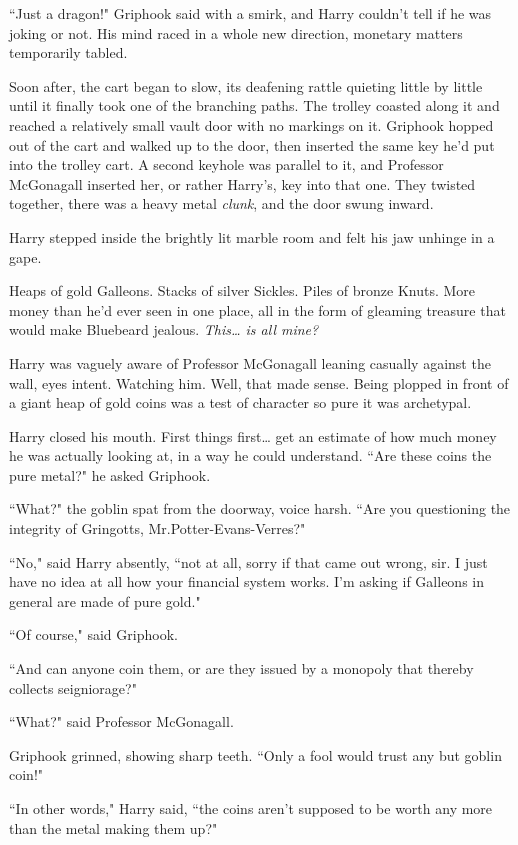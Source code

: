 ``Just a dragon!" Griphook said with a smirk, and Harry couldn't tell if he was joking or not. His mind raced in a whole new direction, monetary matters temporarily tabled.

Soon after, the cart began to slow, its deafening rattle quieting little by little until it finally took one of the branching paths. The trolley coasted along it and reached a relatively small vault door with no markings on it. Griphook hopped out of the cart and walked up to the door, then inserted the same key he'd put into the trolley cart. A second keyhole was parallel to it, and Professor McGonagall inserted her, or rather Harry's, key into that one. They twisted together, there was a heavy metal \emph{clunk}, and the door swung inward.

Harry stepped inside the brightly lit marble room and felt his jaw unhinge in a gape.

Heaps of gold Galleons. Stacks of silver Sickles. Piles of bronze Knuts. More money than he'd ever seen in one place, all in the form of gleaming treasure that would make Bluebeard jealous. \emph{This{\ldots} is all mine?}

Harry was vaguely aware of Professor McGonagall leaning casually against the wall, eyes intent. Watching him. Well, that made sense. Being plopped in front of a giant heap of gold coins was a test of character so pure it was archetypal.

Harry closed his mouth. First things first{\ldots} get an estimate of how much money he was actually looking at, in a way he could understand. ``Are these coins the pure metal?" he asked Griphook.

``What?" the goblin spat from the doorway, voice harsh. ``Are you questioning the integrity of Gringotts, Mr.\?Potter-Evans-Verres?"

``No," said Harry absently, ``not at all, sorry if that came out wrong, sir. I just have no idea at all how your financial system works. I'm asking if Galleons in general are made of pure gold."

``Of course," said Griphook.

``And can anyone coin them, or are they issued by a monopoly that thereby collects seigniorage?"

``What?" said Professor McGonagall.

Griphook grinned, showing sharp teeth. ``Only a fool would trust any but goblin coin!"

``In other words," Harry said, ``the coins aren't supposed to be worth any more than the metal making them up?"

